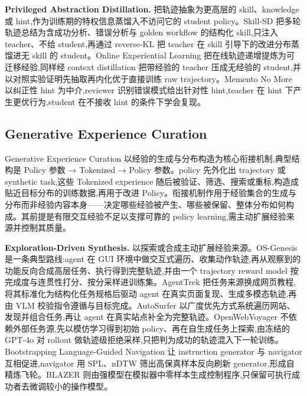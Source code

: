 \textbf{Privileged Abstraction Distillation.} 把轨迹抽象为更高层的 skill、knowledge 或 hint,作为训练期的特权信息蒸馏入不访问它的 student policy。Skill-SD \cite{Wan26al} 把多轮轨迹总结为含成功分析、错误分析与 golden workflow 的结构化 skill,只注入 teacher、不给 student,再通过 reverse-KL 把 teacher 在 skill 引导下的改进分布蒸馏进无 skill 的 student。Online Experiential Learning \cite{Ye26f} 把在线轨迹递增提炼为可迁移经验,同样经 context distillation 把带经验的 teacher 压成无经验的 student,并以对照实验证明先抽取再内化优于直接训练 raw trajectory。Memento No More \cite{Ala25} 以纠正性 hint 为中介,reviewer 识别错误模式给出针对性 hint,teacher 在 hint 下产生更优行为,student 在不接收 hint 的条件下学会复现。

\subsection{Generative Experience Curation}

Generative Experience Curation 以经验的生成与分布构造为核心衔接机制,典型结构是 Policy 参数 → Tokenized → Policy 参数。policy 先外化出 trajectory 或 synthetic task,这些 Tokenized experience 随后被验证、筛选、搜索或重标,构造成贴近目标分布的训练数据,再用于改进 Policy。衔接机制作用于经验集合的生成与分布而非经验内容本身——决定哪些经验被产生、哪些被保留、整体分布如何构成。其前提是有限交互经验不足以支撑可靠的 policy learning,需主动扩展经验来源并控制其质量。

\textbf{Exploration-Driven Synthesis.} 以探索或合成主动扩展经验来源。OS-Genesis \cite{Sun24b} 是一条典型路线:agent 在 GUI 环境中做交互式遍历、收集动作轨迹,再从观察到的功能反向合成高层任务、执行得到完整轨迹,并由一个 trajectory reward model 按完成度与连贯性打分、按分采样进训练集。AgentTrek \cite{Xu24} 把任务来源换成网页教程,将其标准化为结构化任务规格后驱动 agent 在真实页面复现、生成多模态轨迹,再由 VLM 校验指令遵循与目标完成。AutoSurfer \cite{Fai26} 以广度优先方式系统遍历网站、发现并组合任务,再让 agent 在真实站点补全为完整轨迹。OpenWebVoyager \cite{He24e} 不依赖外部任务源,先以模仿学习得到初始 policy、再在自生成任务上探索,由冻结的 GPT-4o 对 rollout 做轨迹级拒绝采样,只把判为成功的轨迹混入下一轮训练。Bootstrapping Language-Guided Navigation \cite{Wan24ad} 让 instruction generator 与 navigator 互相促进,navigator 用 SPL、nDTW 筛出高保真样本反向刷新 generator,形成自精炼飞轮。BLAZER \cite{Das25} 则由强模型在模拟器中零样本生成控制程序,只保留可执行成功者去微调较小的操作模型。

